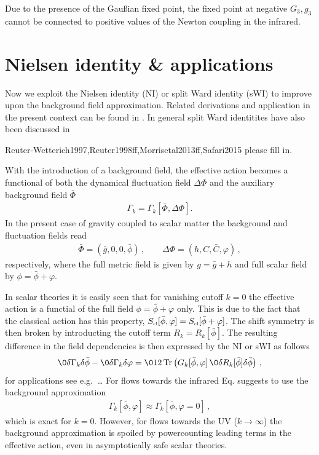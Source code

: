 \documentclass[11pt]{book} %
\newcommand{\Tr}{\mathrm{Tr}}
\begin{document}
Due to the presence of the Gau\ss{}ian fixed point, the fixed point at
negative $G_3, g_3$ cannot be connected to positive values of the
Newton coupling in the infrared.


\section{Nielsen identity \& applications}
Now we exploit the Nielsen identity (NI) or split Ward identity (sWI) to
improve upon the background field approximation. Related derivations
and application in the present context can be found in
\cite{Litim:2002ce,Litim:2002hj,Pawlowski:2003sk,PawlowskiH,Pawlowski:2005xe,Donkin,Donkin:2012ud}. In
general split Ward identitites have also been discussed in
{Reuter-Wetterich1997,Reuter1998ff,Morrisetal2013ff,Safari2015
{\coljmp please fill in}.

With the introduction of a background field,
the effective action becomes a functional of both
the dynamical fluctuation field $\Delta\Phi$ and the auxiliary
background field $\bar\Phi$
\begin{align}
\Gamma_k=\Gamma_k[\bar\Phi,\Delta\Phi].
\end{align}
In the present case of
gravity coupled to scalar matter the background and fluctuation fields read
\begin{align}
  \bar\Phi=(\bar g, 0,0,\bar \phi)\,,\qquad \Delta\Phi= (h,C,\bar
  C,\varphi)\,,
\end{align}
respectively,
where the full metric field is given by $g=\bar g+h$ and full scalar field
by $\phi=\bar\phi+\varphi$.

In scalar theories it is easily seen that for
vanishing cutoff $k=0$ the effective action is a functial of
the full field
$\phi=\bar\phi+\varphi$ only.
This is due to the fact that the classical action has
this property,
$S_{\text{\tiny cl}}[\bar\phi,\varphi]=S_{\text{\tiny
    cl}}[\bar\phi+\varphi]$.
The shift symmetry is then broken
by introducting the cutoff term $R_k=R_k[\bar\phi]$.
The resulting difference in the field dependencies is
then expressed by the NI or sWI as follows
\cite{Litim:2002hj}
\begin{align}\label{eq:scalarNIk}
	\0{\delta \Gamma_k}{\delta\bar\phi}-\0{\delta
	\Gamma_k}{\delta\varphi} =
	\012\, \Tr \left(
		G_k[\bar\phi,\varphi]\,
		\0{\delta R_k[\bar\phi]}{\delta \bar\phi}
	\right) \,,
\end{align}
for applications see e.g.\ \dots%
For flows towards the
infrared Eq.  suggests
to use the background approximation
\begin{align}\label{eq:backapprox}
	\Gamma_k[\bar\phi,\varphi]\approx \Gamma_k[\bar\phi,\varphi=0]\,,
\end{align}
which is exact for $k=0$.
However, for flows towards the UV ($k\to\infty$)
the background approximation
is spoiled by powercounting leading
terms in the effective action,
even in asymptotically safe scalar theories.

}
\end{document}
